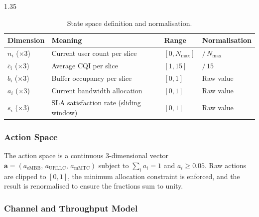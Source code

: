 \begin{table}[h]
  \centering
  \begin{spacing}{1.35}
  \caption{State space definition and normalisation.}\vspace{0.7em}
  \label{table:statespace}
    \begin{tabular}{|p{2.5cm}|p{5.5cm}|p{2.5cm}|p{3cm}|}
    \hline
    \textbf{Dimension} & \textbf{Meaning} & \textbf{Range} & \textbf{Normalisation} \\
    \hline
    $n_i$ ($\times 3$) & Current user count per slice & $[0, N_{\max}]$ & $/\, N_{\max}$ \\
    \hline
    $\bar{c}_i$ ($\times 3$) & Average CQI per slice & $[1, 15]$ & $/\, 15$ \\
    \hline
    $b_i$ ($\times 3$) & Buffer occupancy per slice & $[0, 1]$ & Raw value \\
    \hline
    $a_i$ ($\times 3$) & Current bandwidth allocation & $[0, 1]$ & Raw value \\
    \hline
    $s_i$ ($\times 3$) & SLA satisfaction rate (sliding window) & $[0, 1]$ & Raw value \\
    \hline
    \end{tabular}
  \end{spacing}
\end{table}

\subsubsection{Action Space}

The action space is a continuous 3-dimensional vector $\mathbf{a} = (a_{\text{eMBB}},\, a_{\text{URLLC}},\, a_{\text{mMTC}})$ subject to $\sum_i a_i = 1$ and $a_i \geq 0.05$. Raw actions are clipped to $[0,1]$, the minimum allocation constraint is enforced, and the result is renormalised to ensure the fractions sum to unity.

\subsubsection{Channel and Throughput Model}

